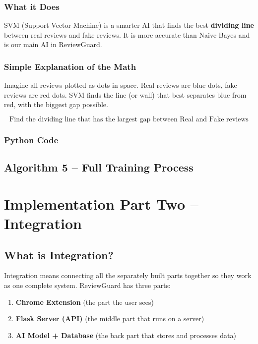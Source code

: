 \documentclass[10pt, a4paper]{report}
\begin{document}
\subsection{What it Does}

SVM (Support Vector Machine) is a smarter AI that finds the best \textbf{dividing line} between real reviews and fake reviews. It is more accurate than Naive Bayes and is our main AI in ReviewGuard.

\subsection{Simple Explanation of the Math}

Imagine all reviews plotted as dots in space. Real reviews are blue dots, fake reviews are red dots. SVM finds the line (or wall) that best separates blue from red, with the biggest gap possible.

\[
\text{Find the dividing line that has the largest gap between Real and Fake reviews}
\]

\subsection{Python Code}

\section{Algorithm 5 -- Full Training Process}

\chapter{Implementation Part Two -- Integration}

\section{What is Integration?}

Integration means connecting all the separately built parts together so they work as one complete system. ReviewGuard has three parts:

\begin{enumerate}
  \item \textbf{Chrome Extension} (the part the user sees)
  \item \textbf{Flask Server (API)} (the middle part that runs on a server)
  \item \textbf{AI Model + Database} (the back part that stores and processes data)
\end{enumerate}
\end{document}
